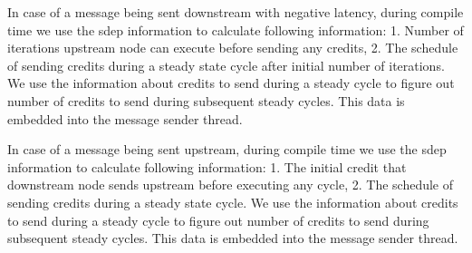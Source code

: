 In case of a message being sent downstream with negative latency, during compile time we use the sdep information to calculate following information:
1. Number of iterations upstream node can execute before sending any credits,
2. The schedule of sending credits during a steady state cycle after initial number of iterations.
We use the information about credits to send during a steady cycle to figure out number of credits to send during subsequent steady cycles. This data is embedded into the message sender thread.

In case of a message being sent upstream, during compile time we use the sdep information to calculate following information:
1. The initial credit that downstream node sends upstream before executing any cycle,
2. The schedule of sending credits during a steady state cycle.
We use the information about credits to send during a steady cycle to figure out number of credits to send during subsequent steady cycles. This data is embedded into the message sender thread.

